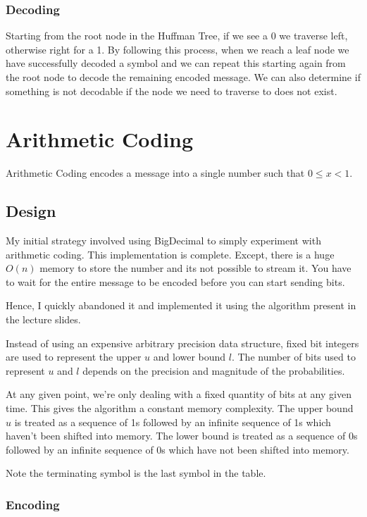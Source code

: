 \documentclass{article}
\begin{document}
\subsubsection{Decoding}

Starting from the root node in the Huffman Tree, if we see a 0 we traverse left, otherwise right for a 1. By following this process, when we reach a leaf node we have successfully decoded a symbol and we can repeat this starting again from the root node to decode the remaining encoded message. We can also determine if something is not decodable if the node we need to traverse to does not exist.

\section{Arithmetic Coding}

Arithmetic Coding encodes a message into a single number such that $ 0 \leq x < 1 $.

\subsection{Design}

My initial strategy involved using BigDecimal to simply experiment with arithmetic coding. This implementation is complete. Except, there is a huge $O(n)$ memory to store the number and its not possible to stream it. You have to wait for the entire message to be encoded before you can start sending bits.

Hence, I quickly abandoned it and implemented it using the algorithm present in the lecture slides.

Instead of using an expensive arbitrary precision data structure, fixed bit integers are used to represent the upper $u$ and lower bound $l$. The number of bits used to represent $u$ and $l$ depends on the precision and magnitude of the probabilities.

At any given point, we're only dealing with a fixed quantity of bits at any given time. This gives the algorithm a constant memory complexity. The upper bound $u$ is treated as a sequence of 1s followed by an infinite sequence of 1s which haven't been shifted into memory. The lower bound is treated as a sequence of 0s followed by an infinite sequence of 0s which have not been shifted into memory.

Note the terminating symbol is the last symbol in the table.

\subsubsection{Encoding}
\end{document}
